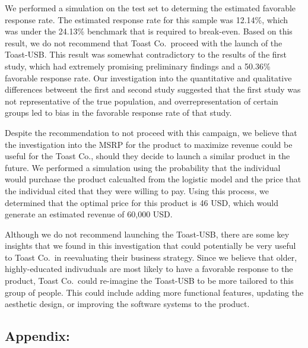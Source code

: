 \documentclass[]{article}
\begin{document}
We performed a simulation on the test set to determing the estimated
favorable response rate. The estimated response rate for this sample was
12.14\%, which was under the 24.13\% benchmark that is required to
break-even. Based on this result, we do not recommend that Toast
Co.~proceed with the launch of the Toast-USB. This result was somewhat
contradictory to the results of the first study, which had extremely
promising preliminary findings and a 50.36\% favorable response rate.
Our investigation into the quantitative and qualitative differences
betweent the first and second study suggested that the first study was
not representative of the true population, and overrepresentation of
certain groups led to bias in the favorable response rate of that study.

Despite the recommendation to not proceed with this campaign, we believe
that the investigation into the MSRP for the product to maximize revenue
could be useful for the Toast Co., should they decide to launch a
similar product in the future. We performed a simulation using the
probability that the individual would purchase the product calcualted
from the logistic model and the price that the individual cited that
they were willing to pay. Using this process, we determined that the
optimal price for this product is 46 USD, which would generate an
estimated revenue of 60,000 USD.

Although we do not recommend launching the Toast-USB, there are some key
insights that we found in this investigation that could potentially be
very useful to Toast Co.~in reevaluating their business strategy. Since
we believe that older, highly-educated indivuduals are most likely to
have a favorable response to the product, Toast Co.~could re-imagine the
Toast-USB to be more tailored to this group of people. This could
include adding more functional features, updating the aesthetic design,
or improving the software systems to the product.

\hypertarget{appendix}{%
\subsection{Appendix:}\label{appendix}}
\end{document}
